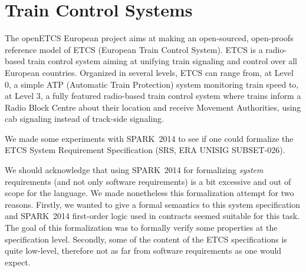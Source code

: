\documentclass[10pt,a4paper,twocolumn]{article}
\newcommand{\DOC}{\textsc{do-178c}\xspace}
\newcommand{\openetcs}{openETCS\xspace}
\newcommand{\newspark}{SPARK~2014\xspace}
\begin{document}


\section{Train Control Systems}
\label{sec:openETCS}


The \openetcs European project
aims at making an open-sourced, open-proofs reference model of ETCS
(European Train Control System). ETCS is a radio-based train control
system aiming at unifying train signaling and control over all
European countries. Organized in several levels, ETCS can range from,
at Level 0, a simple ATP (Automatic Train Protection) system
monitoring train speed to, at Level 3, a fully featured radio-based
train control system where trains inform a Radio Block Centre about
their location and receive Movement Authorities, using cab signaling
instead of track-side signaling.

We made some experiments with \newspark to see if one could formalize
the ETCS System Requirement Specification (SRS, ERA UNISIG
SUBSET-026).

We should acknowledge that using \newspark for formalizing
\emph{system} requirements (and not only software requirements) is a
bit excessive and out of scope for the language. We made nonetheless
this formalization attempt for two reasons. Firstly, we wanted to give
a formal semantics to this system specification and \newspark
first-order logic used in contracts seemed suitable for
this task. The goal of this formalization was to formally verify some
properties at the specification level.  Secondly, some of
the content of the ETCS specifications is quite low-level, therefore
not as far from software requirements as one would expect.
\end{document}
